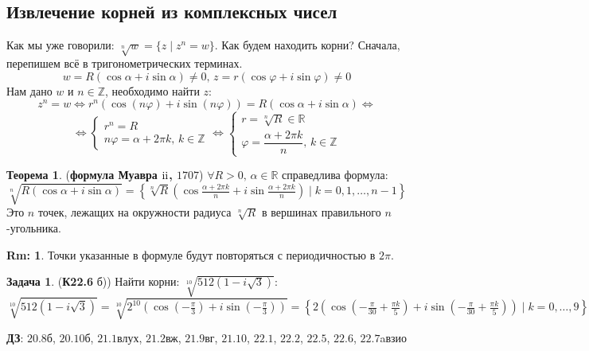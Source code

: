 \documentclass[12pt]{article}
\newcommand{\RN}[1]{%
	\textup{\uppercase\expandafter{\romannumeral#1}}%
}
\newcommand{\MR}{\mathbb{R}}
\newcommand{\MZ}{\mathbb{Z}}
\theoremstyle{definition}
\newtheorem{rem}{Rm:}
\newtheorem{problem}{Задача}
\newtheorem{theorem}{Теорема}
\begin{document}
\newpage
\subsection*{Извлечение корней из комплексных чисел}
Как мы уже говорили: $\sqrt[n]{w} = \{z \mid z^n = w\}$. Как будем находить корни? Сначала, перепишем всё в тригонометрических терминах.
$$
	w = R(\cos\alpha + i\sin\alpha) \neq 0, \, z = r(\cos\varphi + i\sin\varphi) \neq 0
$$
Нам дано $w$ и $n \in \MZ$, необходимо найти $z$:
$$
	z^n = w \Leftrightarrow r^n(\cos(n\varphi) + i\sin(n\varphi)) = R(\cos\alpha + i \sin\alpha) \Leftrightarrow 
$$	
$$
	\Leftrightarrow
	\begin{cases}
		r^n = R\\
		n\varphi = \alpha + 2\pi k, \, k \in \MZ
	\end{cases}
	\Leftrightarrow 
	\begin{cases}
		r = \sqrt[n]{R} \in \MR\\
		\varphi = \dfrac{\alpha + 2\pi k}{n}, \, k \in \MZ
	\end{cases}
$$
\begin{theorem}(\textbf{формула Муавра $\RN{2}$, $1707$})
	$\forall R > 0, \, \alpha \in \MR$ справедлива формула:
	$$
		\sqrt[n]{R(\cos\alpha + i \sin\alpha)} = \left\{\sqrt[n]{R}\left( \cos\tfrac{\alpha + 2\pi k}{n} + i\sin\tfrac{\alpha + 2\pi k}{n}\right) \mid k = 0,1, \dotsc, n-1\right\}
	$$
	Это $n$ точек, лежащих на окружности радиуса $\sqrt[n]{R}$ в вершинах правильного $n$-угольника.
\end{theorem}
\begin{rem}
	Точки указанные в формуле будут повторяться с периодичностью в $2\pi$.
\end{rem}

\begin{problem}(\textbf{К22.6} б))
	Найти корни: $\sqrt[10]{512(1 - i\sqrt{3})}$:
	$$
		\sqrt[10]{512(1 - i\sqrt{3})} = \sqrt[10]{2^{10}\left(\cos\left(-\tfrac{\pi}{3}\right) + i\sin\left(-\tfrac{\pi}{3}\right)\right)} = \left\{2\left( \cos\left(-\tfrac{\pi}{30} + \tfrac{\pi k}{5}\right) + i\sin\left(-\tfrac{\pi}{30} + \tfrac{\pi k}{5}\right)\right)  \mid k = 0, \dotsc,9\right\}
	$$
\end{problem}

\textbf{ДЗ}: $20.8$б, $20.10$б, $21.1$влух, $21.2$вж, $21.9$вг, $21.10$, $22.1$, $22.2$, $22.5$, $22.6$, $22.7$aвзио
\end{document}
